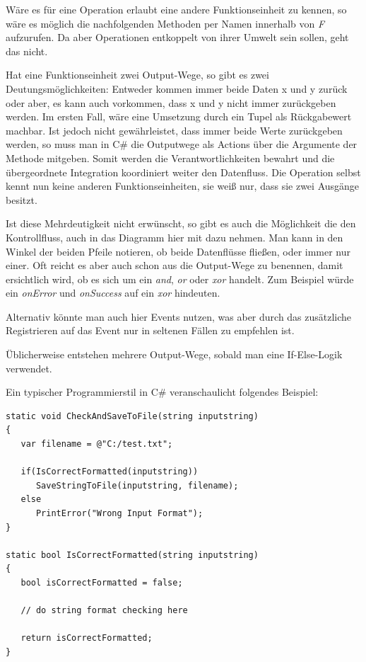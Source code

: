 Wäre es für eine Operation erlaubt eine andere Funktionseinheit zu kennen, so
wäre es möglich die nachfolgenden Methoden per Namen innerhalb von \emph{F}
aufzurufen. Da aber Operationen entkoppelt von ihrer Umwelt sein sollen, geht das nicht.

Hat eine Funktionseinheit zwei Output-Wege, so gibt es zwei
Deutungsmöglichkeiten: Entweder kommen immer beide Daten x und y zurück oder
aber, es kann auch vorkommen, dass x und y nicht immer zurückgeben werden.
Im ersten Fall, wäre eine Umsetzung durch ein Tupel als Rückgabewert machbar.
Ist jedoch nicht gewährleistet, dass immer beide Werte zurückgeben werden, so
muss man in C\# die Outputwege als Actions über die Argumente der Methode
mitgeben. Somit werden die Verantwortlichkeiten bewahrt und die übergeordnete
Integration koordiniert weiter den Datenfluss. Die Operation selbst kennt nun keine
anderen Funktionseinheiten, sie weiß nur, dass sie zwei Ausgänge besitzt.

Ist diese Mehrdeutigkeit nicht erwünscht, so gibt es auch die Möglichkeit die den Kontrollfluss, auch in das Diagramm hier mit
dazu nehmen. Man kann in den Winkel der beiden Pfeile notieren, ob beide
Datenflüsse fließen, oder immer nur einer. 
Oft reicht es aber auch schon aus die Output-Wege zu benennen, damit ersichtlich
wird, ob es sich um ein \emph{and}, \emph{or} oder \emph{xor} handelt. Zum Beispiel würde ein \emph{onError}
und \emph{onSuccess} auf ein \emph{xor} hindeuten.

Alternativ könnte man auch hier Events nutzen, was aber durch das zusätzliche
Registrieren auf das Event nur in seltenen Fällen zu empfehlen ist.


Üblicherweise entstehen mehrere Output-Wege, sobald man eine
If-Else-Logik verwendet.

\pagebreak

Ein typischer Programmierstil in C\# veranschaulicht folgendes Beispiel:
\begin{lstlisting}
static void CheckAndSaveToFile(string inputstring)
{
   var filename = @"C:/test.txt";

   if(IsCorrectFormatted(inputstring))
      SaveStringToFile(inputstring, filename);
   else
      PrintError("Wrong Input Format");
}

static bool IsCorrectFormatted(string inputstring)
{
   bool isCorrectFormatted = false;

   // do string format checking here

   return isCorrectFormatted;
}
\end{lstlisting}

